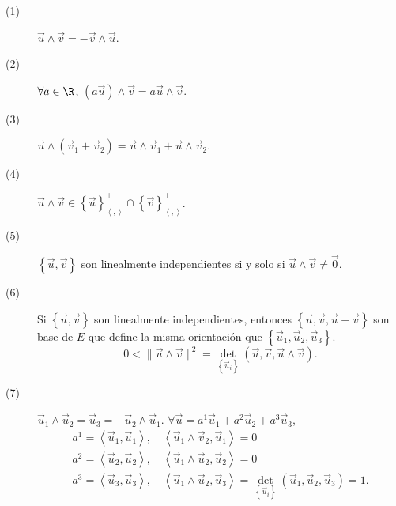 \begin{fprop}[]
\normalfont 
\begin{description}
\item[(1)] $\displaystyle \vec{u} \land \vec{v} = - \vec{v}\land\vec{u} $.
\item[(2)] $\displaystyle \forall a \in \R $, $\displaystyle \left(a\vec{u}\right)\land\vec{v} = a \vec{u} \land \vec{v} $.
\item[(3)] $\displaystyle \vec{u}\land\left(\vec{v}_{1} + \vec{v}_{2}\right) = \vec{u} \land \vec{v}_{1} + \vec{u}\land \vec{v}_{2} $.
\item[(4)] $\displaystyle \vec{u}\land\vec{v} \in \left\{ \vec{u}\right\} ^{\perp }_{\left\langle ,  \right\rangle } \cap \left\{ \vec{v}\right\} ^{\perp }_{\left\langle ,  \right\rangle } $.
\item[(5)] $\displaystyle \left\{ \vec{u}, \vec{v}\right\}  $ son linealmente independientes si y solo si $\displaystyle \vec{u} \land \vec{v} \neq \vec{0} $.
\item[(6)] Si $\displaystyle \left\{ \vec{u}, \vec{v}\right\}  $ son linealmente independientes, entonces $\displaystyle \left\{ \vec{u}, \vec{v}, \vec{u}+\vec{v}\right\}  $ son base de $\displaystyle E $ que define la misma orientación que $\displaystyle \left\{ \vec{u}_{1}, \vec{u}_{2}, \vec{u}_{3}\right\}  $. 
	\[ 0 < \|\vec{u}\land\vec{v}\|^{2} = \det_{ \left\{ \vec{u}_{i}\right\} }\left(\vec{u}, \vec{v}, \vec{u}\land\vec{v}\right) .\]
\item[(7)] $\displaystyle \vec{u}_{1} \land \vec{u}_{2} = \vec{u}_{3} = -\vec{u}_{2}\land\vec{u}_{1} $. $\displaystyle \forall \vec{u} = a^{1}\vec{u}_{1} + a^{2}\vec{u}_{2} + a^{3}\vec{u}_{3} $, 
	\[
	\begin{split}
	a^{1} = \left\langle \vec{u}_{1}, \vec{u}_{1} \right\rangle, \quad \left\langle \vec{u}_{1}\land\vec{v}_{2}, \vec{u}_{1} \right\rangle = 0 \\
	a^{2} = \left\langle \vec{u}_{2}, \vec{u}_{2} \right\rangle, \quad \left\langle \vec{u}_{1}\land\vec{u}_{2}, \vec{u}_{2} \right\rangle = 0 \\
	a^{3} = \left\langle \vec{u}_{3}, \vec{u}_{3} \right\rangle, \quad \left\langle \vec{u}_{1}\land\vec{u}_{2}, \vec{u}_{3} \right\rangle = \det_{ \left\{ \vec{u}_{i}\right\} }\left(\vec{u}_{1}, \vec{u}_{2}, \vec{u}_{3}\right) = 1 .
	\end{split}
	\]	
\end{description}
\end{fprop}
